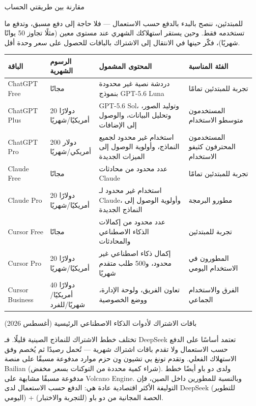 \begin{center}\small\color{gray}مقارنة بين طريقتي الحساب\end{center}

للمبتدئين، ننصح بالبدء بالدفع حسب الاستعمال — فلا حاجة إلى دفع مسبق، وتدفع ما تستخدمه فقط. وحين يستقر استهلاكك الشهري عند مستوى معين (مثلًا تجاوز 50 يوانًا شهريًا)، فكّر حينها في الانتقال إلى الاشتراك بالباقات للحصول على سعر وحدة أقل.


\begin{center}
\begin{tabularx}{\linewidth}{|X|X|X|X|}
\hline
\textbf{الباقة} & \textbf{الرسوم الشهرية} & \textbf{المحتوى المشمول} & \textbf{الفئة المناسبة} \tabularnewline
\hline
ChatGPT Free & مجانًا & دردشة نصية غير محدودة بنموذج GPT-5.6 Luna & تجربة للمبتدئين تمامًا \tabularnewline
ChatGPT Plus & 20 دولارًا أمريكيًا/شهريًا & GPT-5.6 Sol، وتوليد الصور، وتحليل البيانات، والوصول إلى الإضافات & المستخدمون متوسطو الاستخدام \tabularnewline
ChatGPT Pro & 200 دولار أمريكي/شهريًا & استخدام غير محدود لجميع النماذج، وأولوية الوصول إلى الميزات الجديدة & المستخدمون المحترفون كثيفو الاستخدام \tabularnewline
Claude Free & مجانًا & عدد محدود من محادثات Claude & تجربة للمبتدئين تمامًا \tabularnewline
Claude Pro & 20 دولارًا أمريكيًا/شهريًا & استخدام غير محدود لـ Claude، وأولوية الوصول إلى النماذج الجديدة & مطورو البرمجة \tabularnewline
Cursor Free & مجانًا & عدد محدود من إكمالات الذكاء الاصطناعي والمحادثات & تجربة للمبتدئين \tabularnewline
Cursor Pro & 20 دولارًا أمريكيًا/شهريًا & إكمال ذكاء اصطناعي غير محدود، و500 طلب متقدم شهريًا & المطورون في الاستخدام اليومي \tabularnewline
Cursor Business & 40 دولارًا أمريكيًا/شهريًا/للفرد & تعاون الفريق، ولوحة الإدارة، ووضع الخصوصية & الفرق والاستخدام الجماعي \tabularnewline
\hline
\end{tabularx}
\end{center}

\begin{center}\small\color{gray}باقات الاشتراك لأدوات الذكاء الاصطناعي الرئيسية (أغسطس 2026)\end{center}

تختلف خطط الاشتراك للنماذج الصينية قليلًا. فـ DeepSeek تعتمد أساسًا على الدفع حسب الاستعمال ولا تقدم باقات اشتراك شهرية — تُحمل رصيدًا ثم يُخصم وفق الاستهلاك الفعلي. وتقدم تونغ يي تشيون وِن حزم موارد مدفوعة مسبقًا على منصة Bailian (شراء كمية محددة من التوكنات بسعر مخفض). ولدى دو باو أيضًا خطط مدفوعة مسبقًا مشابهة على Volcano Engine. وبالنسبة للمطورين داخل الصين، فإن التوليفة الأكثر اقتصادية عادة هي: الدفع حسب الاستعمال لدى DeepSeek (للتطوير اليومي) + الحصة المجانية من دو باو (للتجربة والاختبار).

